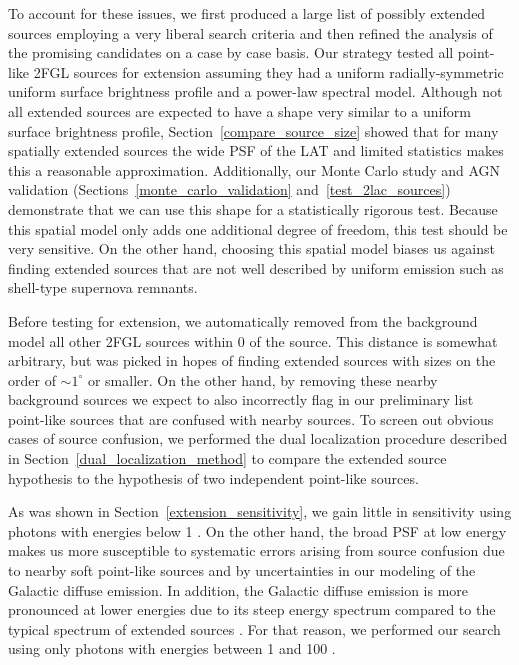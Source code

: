\documentclass[12pt,preprint]{aastex}
\newcommand{\gev}{\text{GeV}\xspace}
\newcommand{\degree}{^\circ\xspace}
\begin{document}
To account for these issues, we first produced a large list of
possibly extended sources employing a very liberal search criteria
and then refined the analysis of the promising candidates on a case
by case basis.  Our strategy tested all point-like 2FGL sources for
extension assuming they had a uniform radially-symmetric uniform surface
brightness profile and a power-law spectral model.  Although not all
extended sources are expected to have a shape very similar to a uniform
surface brightness profile, Section~\ref{compare_source_size} showed that
for many spatially extended sources the wide PSF of the LAT and limited
statistics makes this a reasonable approximation.  Additionally, our Monte
Carlo study and AGN validation (Sections~\ref{monte_carlo_validation}
and~\ref{test_2lac_sources}) demonstrate that we can use this shape
for a statistically rigorous test. Because this spatial model only adds
one additional degree of freedom, this test should be very sensitive.
On the other hand, choosing this spatial model biases us against
finding extended sources that are not well described by uniform emission
such as shell-type supernova remnants.

Before testing for extension,
we automatically removed from the background model all other 2FGL
sources within 0 of the source.  This distance is somewhat arbitrary,
but was picked in hopes of finding extended sources with sizes on the
order of $\sim1\degree$ or smaller. On the other hand, by removing
these nearby background sources we expect to also incorrectly flag 
in our preliminary list point-like sources that are 
confused with
nearby sources.  To screen out obvious cases of source
confusion, we performed the dual localization procedure described in
Section~\ref{dual_localization_method} to compare the extended source
hypothesis to the hypothesis of two independent point-like sources.

As was shown in Section~\ref{extension_sensitivity}, we gain little in
sensitivity using photons with energies below 1 \gev. On the other hand,
the broad PSF at low energy makes us more susceptible to systematic
errors arising from source confusion due to nearby soft point-like sources
and by uncertainties in our modeling of the Galactic diffuse emission. 
In addition, the Galactic
diffuse emission is more pronounced at lower energies due to its steep
energy spectrum compared to the typical spectrum of extended sources \citep{intermediate_diffuse_lat}.
For that reason,
we performed our search using only photons with energies between 1 \gev
and 100 \gev.
\end{document}

